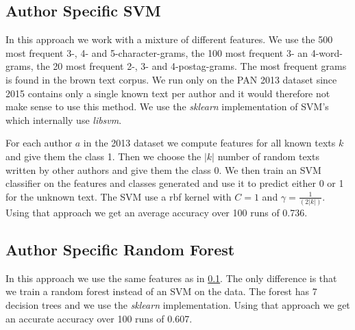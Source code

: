 \subsection{Author Specific SVM} \label{subsec:author_specific_svm_impl}
In this approach we work with a mixture of different features. We use the 500
most frequent 3-, 4- and 5-character-grams, the 100 most frequent 3- an
4-word-grams, the 20 most frequent 2-, 3- and 4-postag-grams. The most frequent
grams is found in the brown text corpus. We run only on the PAN 2013 dataset
since 2015 contains only a single known text per author and it would therefore
not make sense to use this method. We use the \textit{sklearn} implementation of
\gls{SVM}'s which internally use \textit{libsvm}.

For each author $a$ in the 2013 dataset we compute features for all known texts
$k$ and give them the class 1. Then we choose the $|k|$ number of random texts
written by other authors and give them the class 0. We then train an \gls{SVM}
classifier on the features and classes generated and use it to predict either 0
or 1 for the unknown text. The \gls{SVM} use a rbf kernel with $C=1$ and
$\gamma = \frac{1}{(2|k|)}$. Using that approach we get an average accuracy over
100 runs of 0.736.

\subsection{Author Specific Random Forest}
In this approach we use the same features as in
\ref{subsec:author_specific_svm_impl}. The only difference is that we train a random
forest instead of an \gls{SVM} on the data. The forest has 7 decision trees and
we use the \textit{sklearn} implementation. Using that approach we get an
accurate accuracy over 100 runs of 0.607.
